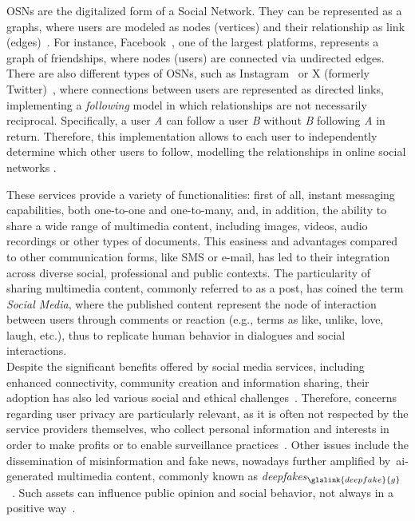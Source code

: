OSNs are the digitalized form of a Social Network. They can be represented as a graphs, where users are modeled as nodes (vertices) and their relationship as link (edges)~\cite{site:social-network-sites-def}. For instance, Facebook~\cite{site:facebook_explenation}, one of the largest platforms, represents a graph of friendships, where nodes (users) are connected via undirected edges. There are also different types of OSNs, such as Instagram~\cite{site:instagram_explenation} or X (formerly Twitter)~\cite{site:twitter_explenation}, where connections between users are represented as directed links, implementing a \textit{following} model in which relationships are not necessarily reciprocal. Specifically, a user \textit{A} can follow a user \textit{B} without \textit{B} following \textit{A} in return. Therefore, this implementation allows to each user to independently determine which other users to follow, modelling the relationships in online social networks \cite{site:brzozowski2011follow}. 

These services provide a variety of functionalities: first of all, instant messaging capabilities, both one-to-one and one-to-many, and, in addition, the ability to share a wide range of multimedia content, including images, videos, audio recordings or other types of documents. This easiness and advantages compared to other communication forms, like SMS or e-mail, has led to their integration across diverse social, professional and public contexts. The particularity of sharing multimedia content, commonly referred to as a post, has coined the term \textit{Social Media}, where the published content represent the node of interaction between users through comments or reaction (e.g., terms as like, unlike, love, laugh, etc.), thus to replicate human behavior in dialogues and social interactions. \\


Despite the significant benefits offered by social media services, including enhanced connectivity, community creation and information sharing, their adoption has also led various social and ethical challenges~\cite{site:ethics-design-factors,}. Therefore, concerns regarding user privacy are particularly relevant, as it is often not respected by the service providers themselves, who collect personal information and interests in order to make profits or to enable surveillance practices~\cite{site:social-privacy-surveillance}. Other issues include the dissemination of misinformation and fake news, nowadays further amplified by~\acrshort{ai}-generated multimedia content, commonly known as \textit{deepfakes}$_{\glslink{deepfake}{g}}$ ~\cite{site:social-deepfake}. Such assets can influence public opinion and social behavior, not always in a positive way~\cite{site:social-deepfake-revenge,site:social-deepfake-effect-political}.

